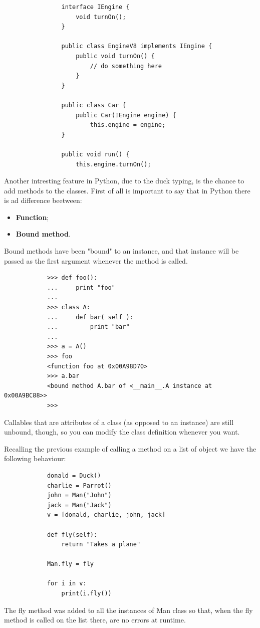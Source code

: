 \documentclass[12pt]{article}
\begin{document}
			\begin{lstlisting}
				interface IEngine {
					void turnOn();
				}
				
				public class EngineV8 implements IEngine {
					public void turnOn() {
						// do something here
					}
				}
				
				public class Car {
					public Car(IEngine engine) {
						this.engine = engine;
				}
				
				public void run() {
					this.engine.turnOn();
			\end{lstlisting}
			
		Another intresting feature in Python, due to the duck typing, is the chance to add methods to the classes. First of all is important to say that in Python there is ad difference beetween:
		\begin{itemize}
			\item \textbf{Function};
			\item \textbf{Bound method}.
		\end{itemize} 
	
		Bound methods have been "bound" to an instance, and that instance will be passed as the first argument whenever the method is called.
		
		\begin{lstlisting}
			>>> def foo():
			...     print "foo"
			...
			>>> class A:
			...     def bar( self ):
			...         print "bar"
			...
			>>> a = A()
			>>> foo
			<function foo at 0x00A98D70>
			>>> a.bar
			<bound method A.bar of <__main__.A instance at 0x00A9BC88>>
			>>>
		\end{lstlisting}
		Callables that are attributes of a class (as opposed to an instance) are still unbound, though, so you can modify the class definition whenever you want.
		
			
		
		Recalling the previous example of calling a method on a list of object we have the following behaviour:
		
		\begin{lstlisting}
			donald = Duck()
			charlie = Parrot()
			john = Man("John")
			jack = Man("Jack")
			v = [donald, charlie, john, jack]
			
			def fly(self):
				return "Takes a plane"
			
			Man.fly = fly
			
			for i in v:
				print(i.fly())
		\end{lstlisting}
		
		The fly method was added to all the instances of Man class so that, when the fly method is called on the list there, are no errors at runtime.
		
		
		
	
		
		






		
\end{document}

